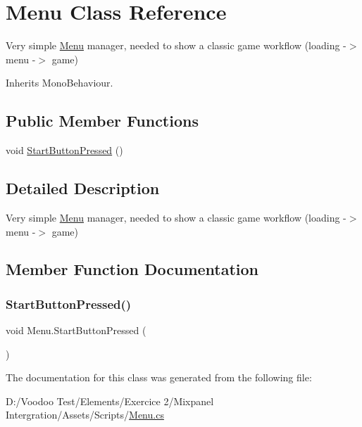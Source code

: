 \hypertarget{class_menu}{}\section{Menu Class Reference}
\label{class_menu}


Very simple \mbox{\hyperlink{class_menu}{Menu}} manager, needed to show a classic game workflow (loading -\/$>$ menu -\/$>$ game)  




Inherits Mono\+Behaviour.

\subsection*{Public Member Functions}
\begin{DoxyCompactItemize}
\item 
void \mbox{\hyperlink{class_menu_a0b9a76c54e64d2e4d1daa07b54e8a0f6}{Start\+Button\+Pressed}} ()
\end{DoxyCompactItemize}


\subsection{Detailed Description}
Very simple \mbox{\hyperlink{class_menu}{Menu}} manager, needed to show a classic game workflow (loading -\/$>$ menu -\/$>$ game) 

\subsection{Member Function Documentation}
\mbox{\label{class_menu_a0b9a76c54e64d2e4d1daa07b54e8a0f6}} 
\subsubsection{\texorpdfstring{Start\+Button\+Pressed()}{StartButtonPressed()}}
{\footnotesize\ttfamily void Menu.\+Start\+Button\+Pressed (\begin{DoxyParamCaption}{ }\end{DoxyParamCaption})}



The documentation for this class was generated from the following file\+:\begin{DoxyCompactItemize}
\item 
D\+:/\+Voodoo Test/\+Elements/\+Exercice 2/\+Mixpanel Intergration/\+Assets/\+Scripts/\mbox{\hyperlink{_menu_8cs}{Menu.\+cs}}\end{DoxyCompactItemize}
